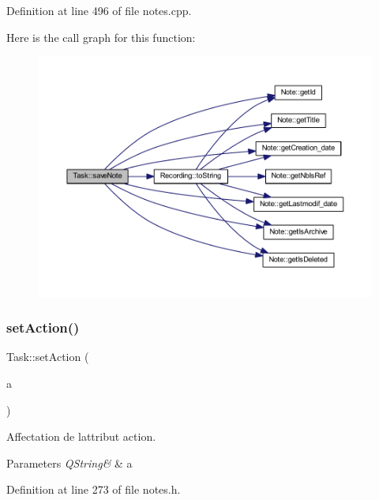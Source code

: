 Definition at line 496 of file notes.\+cpp.

Here is the call graph for this function\+:\nopagebreak
\begin{figure}[H]
\begin{center}
\leavevmode
\includegraphics[width=350pt]{class_task_a313eb342d047e8e5cab91bf51609a2f3_cgraph}
\end{center}
\end{figure}
\mbox{\label{class_task_ad463acfa4bddcc649113c25ea3fe36b8}} 
\subsubsection{\texorpdfstring{set\+Action()}{setAction()}}
{\footnotesize\ttfamily Task\+::set\+Action (\begin{DoxyParamCaption}\item[{const Q\+String \&}]{a }\end{DoxyParamCaption})\hspace{0.3cm}{\ttfamily [inline]}}



Affectation de l\textquotesingle{}attribut action. 


\begin{DoxyParams}{Parameters}
{\em Q\+String\&} & a \\
\hline
\end{DoxyParams}


Definition at line 273 of file notes.\+h.


